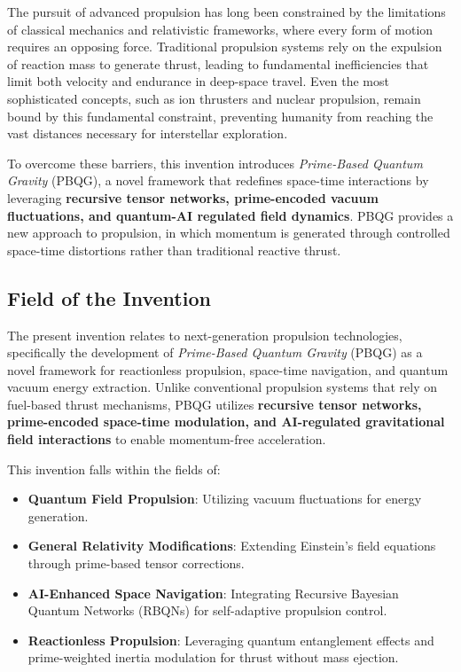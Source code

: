 \documentclass{article}
\theoremstyle{plain}
\begin{document}
The pursuit of advanced propulsion has long been constrained by the limitations of classical mechanics and relativistic frameworks, where every form of motion requires an opposing force. Traditional propulsion systems rely on the expulsion of reaction mass to generate thrust, leading to fundamental inefficiencies that limit both velocity and endurance in deep-space travel. Even the most sophisticated concepts, such as ion thrusters and nuclear propulsion, remain bound by this fundamental constraint, preventing humanity from reaching the vast distances necessary for interstellar exploration.

To overcome these barriers, this invention introduces \textit{Prime-Based Quantum Gravity} (PBQG), a novel framework that redefines space-time interactions by leveraging \textbf{recursive tensor networks, prime-encoded vacuum fluctuations, and quantum-AI regulated field dynamics}. PBQG provides a new approach to propulsion, in which momentum is generated through controlled space-time distortions rather than traditional reactive thrust.

\subsection{Field of the Invention}
\label{subsec:field_of_invention}

The present invention relates to next-generation propulsion technologies, specifically the development of \textit{Prime-Based Quantum Gravity} (PBQG) as a novel framework for reactionless propulsion, space-time navigation, and quantum vacuum energy extraction. Unlike conventional propulsion systems that rely on fuel-based thrust mechanisms, PBQG utilizes \textbf{recursive tensor networks, prime-encoded space-time modulation, and AI-regulated gravitational field interactions} to enable momentum-free acceleration. 

This invention falls within the fields of:
\begin{itemize}
    \item \textbf{Quantum Field Propulsion}: Utilizing vacuum fluctuations for energy generation.
    \item \textbf{General Relativity Modifications}: Extending Einstein’s field equations through prime-based tensor corrections.
    \item \textbf{AI-Enhanced Space Navigation}: Integrating Recursive Bayesian Quantum Networks (RBQNs) for self-adaptive propulsion control.
    \item \textbf{Reactionless Propulsion}: Leveraging quantum entanglement effects and prime-weighted inertia modulation for thrust without mass ejection.
\end{itemize}
\end{document}
